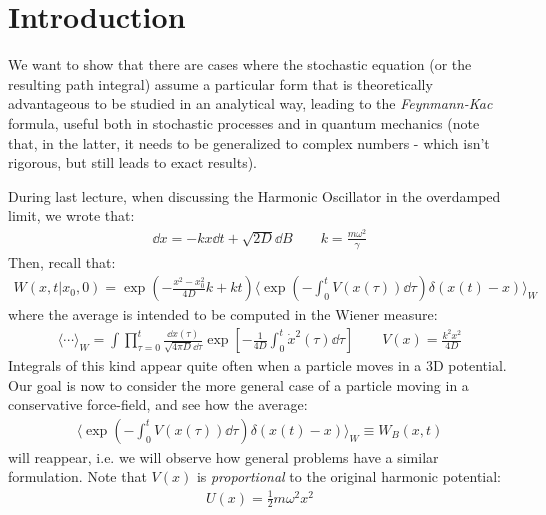 \documentclass[../template.tex]{subfiles}
\begin{document}
\section{Introduction}

We want to show that there are cases where the stochastic equation (or the resulting path integral) assume a particular form that is theoretically advantageous to be studied in an analytical way, leading to the \textit{Feynmann-Kac} formula, useful both in stochastic processes and in quantum mechanics (note that, in the latter, it needs to be generalized to complex numbers - which isn't rigorous, but still leads to exact results).

During last lecture, when discussing the Harmonic Oscillator in the overdamped limit, we wrote that:
\begin{align*}
    \dd{x} = -k x \dd{t} + \sqrt{2D} \dd{B} \qquad k = \frac{m\omega^2}{\gamma} 
\end{align*}
Then, recall that:
\begin{align*}
    W(x,t|x_0,0) = \exp\left(-\frac{x^2 - x_0^2}{4D}k + kt \right) \langle \exp\left(-\int_0^t V(x(\tau))\dd{\tau}\right) \delta(x(t)-x) \rangle_W 
\end{align*}
where the average is intended to be computed in the Wiener measure:
\begin{align*}
    \langle \cdots \rangle_W = \int \prod_{\tau = 0}^{t} \frac{\dd{x(\tau)}}{\sqrt{4 \pi D} \dd{\tau}} \exp\left[-\frac{1}{4D} \int_0^t \dot{x}^2 (\tau )\dd{\tau}\right] \qquad V(x) = \frac{k^2 x^2}{4D} 
\end{align*}
Integrals of this kind appear quite often when a particle moves in a 3D potential. Our goal is now to consider the more general case of a particle moving in a conservative force-field, and see how the average:
\begin{align*}
    \langle \exp\left(-\int_0^t V(x(\tau)) \dd{\tau} \right) \delta(x(t)-x)\rangle_W \equiv W_B(x,t)
\end{align*} 
will reappear, i.e. we will observe how general problems have a similar formulation.
Note that $V(x)$ is \textit{proportional} to the original harmonic potential:
\begin{align*}
    U(x) = \frac{1}{2} m \omega^2 x^2 
\end{align*}  
\end{document}
